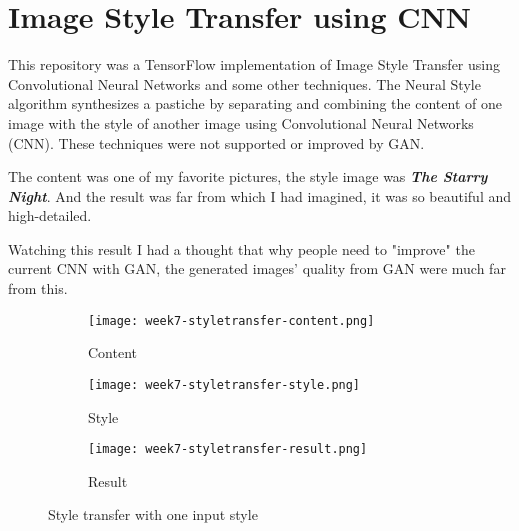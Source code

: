 \section{Image Style Transfer using CNN\cite{styletransfergithub}}
This repository was a TensorFlow implementation of Image Style Transfer using Convolutional Neural Networks\cite{styletransfer} and some other techniques\cite{styletransfervideo}\cite{preservingcolor}. The Neural Style algorithm synthesizes a pastiche by separating and combining the content of one image with the style of another image using Convolutional Neural Networks (CNN). These techniques were not supported or improved by GAN.

The content was one of my favorite pictures, the style image was \textbf{\emph{The Starry Night}}\cite{thestarrynight}. And the result was far from which I had imagined, it was so beautiful and high-detailed.

Watching this result I had a thought that why people need to "improve" the current CNN with GAN, the generated images' quality from GAN were much far from this.

\newpage
\begin{figure}[!ht]
\centering
\begin{subfigure}{\textwidth}
  \centering
  \texttt{[image: week7-styletransfer-content.png]}
  \caption{Content}
\end{subfigure}
\begin{subfigure}{\textwidth}
  \centering
  \texttt{[image: week7-styletransfer-style.png]}
  \caption{Style}
\end{subfigure}
\begin{subfigure}{\textwidth}
  \centering
  \texttt{[image: week7-styletransfer-result.png]}
  \caption{Result}
\end{subfigure}
\caption{Style transfer with one input style}
\end{figure}